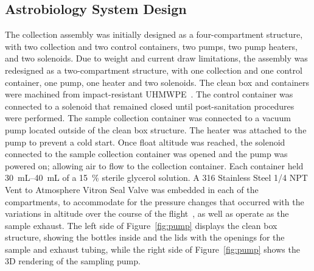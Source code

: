 \subsection{Astrobiology System Design}
\label{sec:Astrobiology Design}


The collection assembly was initially designed as a four-compartment structure, with two collection and two control containers, two pumps, two pump heaters, and two solenoids. Due to weight and current draw  limitations, the assembly was redesigned as a two-compartment structure, with one collection and one control container,  one pump, one heater and two solenoids. The clean box and containers were machined from impact-resistant UHMWPE~\cite{cleanbox}. The control container was connected to a solenoid that remained closed until post-sanitation procedures were performed. The sample collection container was connected to a vacuum pump located outside of the clean box structure. The heater was attached to the pump to prevent a cold start. Once float altitude was reached, the solenoid connected to the sample collection container was opened and the pump was powered on; allowing air to flow to the collection container. Each container held \SIrange{30}{40}{\milli\liter} of a \SI{15}{\%} sterile glycerol solution. A 316 Stainless Steel \SI{1/4}{\inch} NPT Vent to Atmosphere Vitron Seal Valve was embedded in each of the compartments, to accommodate for the pressure changes that occurred with the variations in altitude over the course of the flight~\cite{valve}, as well as operate as the sample exhaust.  The left side of Figure~\ref{fig:pump} displays the clean box structure, showing the bottles inside and the lids with the openings for the sample and exhaust tubing, while the right side of Figure~\ref{fig:pump} shows the 3D rendering of the sampling pump. 


